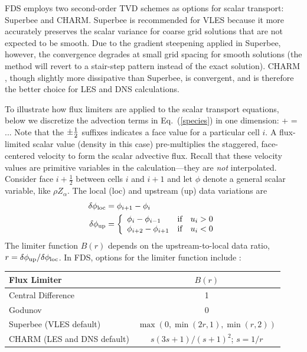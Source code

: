 FDS employs two second-order TVD schemes as options for scalar transport: Superbee and CHARM.  Superbee \cite{Roe:1986} is recommended for VLES because it more accurately preserves the scalar variance for coarse grid solutions that are not expected to be smooth.  Due to the gradient steepening applied in Superbee, however, the convergence degrades at small grid spacing for smooth solutions (the method will revert to a stair-step pattern instead of the exact solution).  CHARM \cite{Zhou:1995}, though slightly more dissipative than Superbee, is convergent, and is therefore the better choice for LES and DNS calculations.

To illustrate how flux limiters are applied to the scalar transport equations, below we discretize the advection terms in Eq.~(\ref{species}) in one dimension:
\be  {}
    +  = ...
\ee
Note that the $\pm\frac{1}{2}$ suffixes indicates a face value for a particular cell $i$. A flux-limited scalar value (density in this case) pre-multiplies the staggered, face-centered velocity to form the scalar advective flux.  Recall that these velocity values are primitive variables in the calculation---they are \emph{not} interpolated.
Consider face $i+\frac{1}{2}$ between cells $i$ and $i+1$ and let $\phi$ denote a general scalar variable, like $\rho Z_\alpha$.  The local (loc) and upstream (up) data variations are
\begin{align}
\delta \phi_{\rm loc} &= \phi_{i+1}-\phi_i \\
\delta \phi_{\rm up}  &= \left\{ \begin{array}{ll} \phi_i-\phi_{i-1} & \mbox{if} \quad u_i>0 \\ \phi_{i+2}-\phi_{i+1} & \mbox{if} \quad u_i<0 \end{array} \right.
\end{align}
The limiter function $B(r)$ depends on the upstream-to-local data ratio, $r=\delta \phi_{\rm up}/\delta \phi_{\rm loc}$. In FDS, options for the limiter function include \cite{Toro}:
\begin{table}[H]
\begin{center}
\begin{tabular}{lc}
Flux Limiter                                    & $B(r)$                         \\
\hline
Central Difference                              & 1                              \\
Godunov                                         & 0                              \\
Superbee \cite{Roe:1986} (VLES default)         & $\max(0,\min(2r,1),\min(r,2))$ \\
CHARM \cite{Zhou:1995} (LES and DNS default)    & $s(3s+1)/(s+1)^2$; $s=1/r$     \\
\end{tabular}
\end{center}
\end{table}
